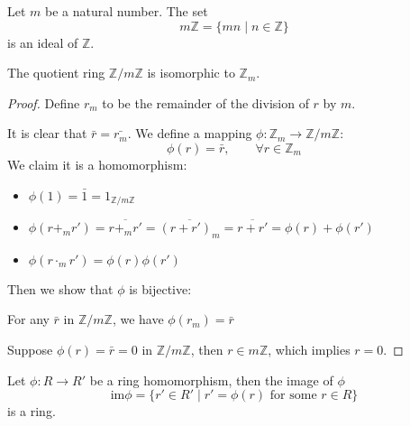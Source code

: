 Let $m$ be a natural number. The set 
\[
m\mathbb{Z}=\{mn\mid n\in\mathbb{Z}\}
\]
is an ideal of $\mathbb{Z}$.
\begin{proposition}
The quotient ring $\mathbb{Z}/m\mathbb{Z}$ is isomorphic to $\mathbb{Z}_m$.
\end{proposition}
\begin{proof}
Define $r_m$ to be the remainder of the division of $r$ by $m$.

It is clear that $\bar{r}=\bar{r_m}$. We define a mapping $\phi:\mathbb{Z}_m\to\mathbb{Z}/m\mathbb{Z}$:
\[
\phi(r)=\bar{r},\qquad\forall r\in\mathbb{Z}_m
\]
We claim it is a homomorphism:
\begin{itemize}
\item
$\phi(1)=\bar{1}=1_{\mathbb{Z}/m\mathbb{Z}}$
\item
$\phi(r+_mr')=\overline{r+_mr'}=\overline{(r+r')_m}=\overline{r+r'}=\phi(r)+\phi(r')$
\item
$\phi(r\cdot_mr')=\phi(r)\phi(r')$
\end{itemize}

Then we show that $\phi$ is bijective:

For any $\bar{r}$ in $\mathbb{Z}/m\mathbb{Z}$, we have $\phi(r_m)=\bar{r}$

Suppose $\phi(r)=\bar r=0$ in $\mathbb{Z}/m\mathbb{Z}$, then $r\in m\mathbb{Z}$, which implies $r=0$.

\end{proof}
\begin{proposition}
Let $\phi:R\to R'$ be a ring homomorphism, then the image of $\phi$
\[
\mbox{im}\phi=\{r'\in R'\mid r'=\phi(r)\mbox{ for some }r\in R\}
\]
is a ring.
\end{proposition}


